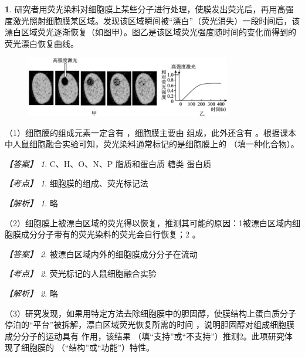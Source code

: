 \documentclass[UTF8, 10pt, a4paper, oneside]{ctexart}
\newcommand{\blank}{ \underbar{\quad$\blacktriangle$\quad} }%
\newcommand{\fs}[1]{{\fangsong #1}}%
\newcommand{\circled}[1]{{\small{\textcircled{\tiny{#1}}}}}%
\theoremstyle{definition}
\newtheorem{exercise}{}
\theoremstyle{remark}
\newtheorem*{answer}{【答案】}
\newtheorem*{point}{【考点】}      %
\newtheorem*{explanation}{【解析】}     %
\theoremstyle{plain}
\begin{document}
\begin{exercise}
    研究者用荧光染料对细胞膜上某些分子进行处理，使膜发出荧光后，再用高强度激光照射细胞膜某区域。发现该区域瞬间被“漂白”（荧光消失）一段时间后，该漂白区域荧光逐渐恢复（如图甲）。图乙是该区域荧光强度随时间的变化而得到的荧光漂白恢复曲线。

    \begin{figure}[h!]
        \centering
        \includegraphics[width=0.8\textwidth]{assists/d2-1.jpg}
    \end{figure}

    （1）细胞膜的组成元素一定含有\blank，细胞膜主要由\blank 组成，此外还含有\blank。根据课本中人鼠细胞融合实验可知，荧光染料通常标记的是细胞膜上的\blank（填一种化合物）。

    \begin{answer}
        C、H、O、N、P \qquad 脂质和蛋白质 \qquad 糖类 \qquad 蛋白质
    \end{answer}
    \begin{point}
        细胞膜的组成、荧光标记法
    \end{point}
    \begin{explanation}
        \fs{略}
    \end{explanation}

    （2）细胞膜上被漂白区域的荧光得以恢复，推测其可能的原因：\circled{1}被漂白区域内细胞膜成分分子带有的荧光染料的荧光会自行恢复；\circled{2}\blank。

    \begin{answer}
        被漂白区域内外的细胞膜成分分子在流动
    \end{answer}
    \begin{point}
        荧光标记的人鼠细胞融合实验
    \end{point}
    \begin{explanation}
        \fs{略}
    \end{explanation}

    （3）研究发现，如果用特定方法去除细胞膜中的胆固醇，使膜结构上蛋白质分子停泊的“平台”被拆解，漂白区域荧光恢复所需的时间\blank，说明胆固醇对组成细胞膜成分分子的运动具有\blank 作用，该结果\blank（填“支持”或“不支持”）推测\circled{2}。此项研究体现了细胞膜的\blank（“结构”或“功能”）特性。


\end{exercise}
\end{document}
